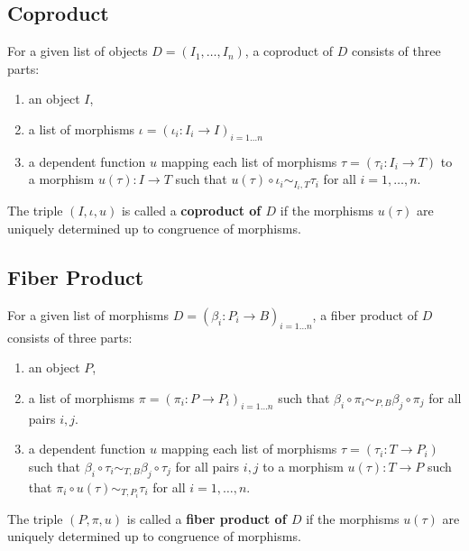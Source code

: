\subsection{Coproduct}

\begin{definition}
 For a given list of objects $D = ( I_1, \dots, I_n )$, a coproduct of $D$ consists of three parts:
 \begin{enumerate}
  \item an object $I$,
  \item a list of morphisms $\iota = ( \iota_i: I_i \rightarrow I )_{i = 1 \dots n}$
  \item a dependent function $u$ mapping each list of morphisms $\tau = ( \tau_i: I_i \rightarrow T )$
  to a morphism $u( \tau ): I \rightarrow T$ such that $u( \tau ) \circ \iota_i \sim_{I_i, T} \tau_i$ for all $i = 1, \dots, n$.
 \end{enumerate}
 The triple $( I, \iota, u )$ is called a \textbf{coproduct of $D$} if the morphisms $u( \tau )$ are uniquely determined up to
 congruence of morphisms.
\end{definition}

\subsection{Fiber Product}

\begin{definition}
 For a given list of morphisms $D = ( \beta_i: P_i \rightarrow B )_{i = 1 \dots n}$, 
 a fiber product of $D$ consists of three parts:
 \begin{enumerate}
  \item an object $P$,
  \item a list of morphisms $\pi = ( \pi_i: P \rightarrow P_i )_{i = 1 \dots n}$ such that
        $\beta_i \circ \pi_i  \sim_{P, B} \beta_j \circ \pi_j$ for all pairs $i,j$.
  \item a dependent function $u$ mapping each list of morphisms
        $\tau = ( \tau_i: T \rightarrow P_i )$ such that
        $\beta_i \circ \tau_i  \sim_{T, B} \beta_j \circ \tau_j$ for all pairs $i,j$
        to a morphism $u( \tau ): T \rightarrow P$ such that
        $\pi_i \circ u( \tau ) \sim_{T, P_i} \tau_i$ for all $i = 1, \dots, n$.
 \end{enumerate}
 The triple $( P, \pi, u )$ is called a \textbf{fiber product of $D$} if the morphisms $u( \tau )$ are uniquely determined up to
 congruence of morphisms.
\end{definition}

